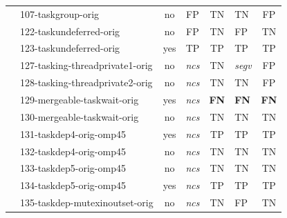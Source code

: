 \begin{table}[]
\begin{tabular}{llc|cclc}
		& 107-taskgroup-orig                                     & no                    & FP                   & TN                   & TN                   & FP                     \\
		& 122-taskundeferred-orig                                & no                    & FP                   & TN                   & FP                   & TN                     \\
		& 123-taskundeferred-orig                                & yes                   & TP                   & TP                   & TP                   & TP                     \\
		& 127-tasking-threadprivate1-orig                        & no                    & \emph{ncs}           & TN                   & \emph{segv}          & FP                     \\
		& 128-tasking-threadprivate2-orig                        & no                    & \emph{ncs}           & TN                   & TN                   & FP                     \\
		& 129-mergeable-taskwait-orig                            & yes                   & \emph{ncs}           & \textbf{FN}          & \textbf{FN}          & \textbf{FN}            \\
		& 130-mergeable-taskwait-orig                            & no                    & \emph{ncs}           & TN                   & TN                   & TN                     \\
		& 131-taskdep4-orig-omp45                                & yes                   & \emph{ncs}           & TP                   & TP                   & TP                     \\
		& 132-taskdep4-orig-omp45                                & no                    & \emph{ncs}           & TN                   & TN                   & TN                     \\
		& 133-taskdep5-orig-omp45                                & no                    & \emph{ncs}           & TN                   & TN                   & TN                     \\
		& 134-taskdep5-orig-omp45                                & yes                   & \emph{ncs}           & TP                   & TP                   & TP                     \\
		& 135-taskdep-mutexinoutset-orig                         & no                    & \emph{ncs}           & TN                   & FP                   & TN                     \\

\end{tabular}
\end{table}
